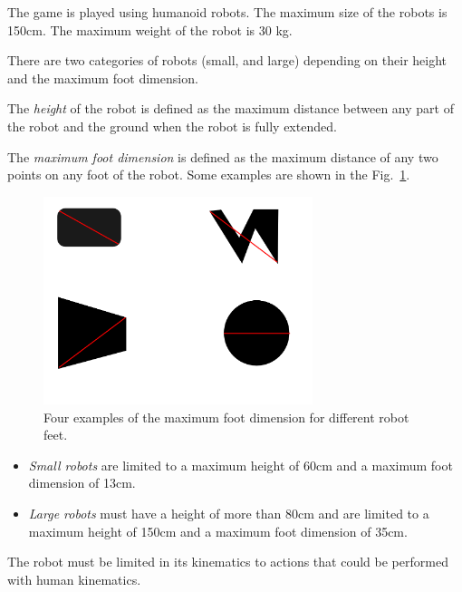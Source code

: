\documentclass[12pt]{hurocup}
\begin{document}
\begin{lawlist}[G]
\item \label{humanoid} The game is played using humanoid robots. The
  maximum size of the robots is 150cm. The maximum weight of the robot
  is 30 kg.
\item \label{categories} There are two categories of robots (small,
and large) depending on their height and the maximum foot
dimension. 

The \emph{height} of the robot is defined as the maximum distance
between any part of the robot and the ground when the robot is fully
extended.

The \emph{maximum foot dimension} is defined as the maximum
distance of any two points on any foot of the robot. Some
examples are shown in the Fig.~\ref{fig:foot-dimension}.

  \begin{figure}
    \begin{center}
      \includegraphics[width=0.7\textwidth]{Figures/foot-dimension}
    \end{center}
    \caption{Four examples of the maximum foot dimension for different
     robot feet.}
    \label{fig:foot-dimension}
  \end{figure}

  \begin{itemize}
    \item \emph{Small robots} are limited to a maximum height of 60cm
       and a maximum foot dimension of 13cm.
    \item \emph{Large robots} must have a height of more than 80cm and
    are limited to a maximum height of 150cm and a maximum foot
    dimension of 35cm.  
  \end{itemize}

\item \label{kinematics} The robot must be limited in its kinematics
to actions that could be performed with human kinematics.


\end{lawlist}
\end{document}
